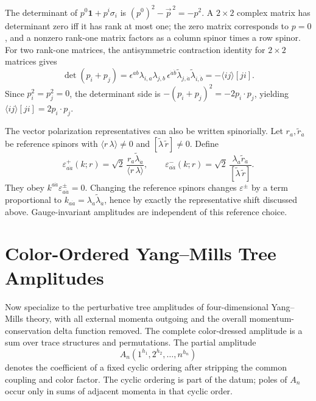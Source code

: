 The determinant of \(p^0\mathbf 1+p^i\sigma_i\) is
\((p^0)^2-\vec p^{\,2}=-p^2\).  A \(2\times2\) complex matrix has determinant
zero iff it has rank at most one; the zero matrix corresponds to \(p=0\), and
a nonzero rank-one matrix factors as a column spinor times a row spinor.  For
two rank-one matrices, the antisymmetric contraction identity for \(2\times2\)
matrices gives
\[
  \det(p_i+p_j)
  =
  \epsilon^{ab}\lambda_{i,a}\lambda_{j,b}\,
  \epsilon^{\dot a\dot b}
  \widetilde\lambda_{j,\dot a}\widetilde\lambda_{i,\dot b}
  =
  -\langle ij\rangle[ji].
\]
Since \(p_i^2=p_j^2=0\), the determinant side is
\(-(p_i+p_j)^2=-2p_i\cdot p_j\), yielding
\(\langle ij\rangle[ji]=2p_i\cdot p_j\).

The vector polarization representatives can also be written spinorially.  Let
\(r_a,\widetilde r_{\dot a}\) be reference spinors with
\(\langle r\,\lambda\rangle\ne0\) and
\([\widetilde\lambda\,\widetilde r]\ne0\).  Define
\begin{equation}
  \varepsilon^+_{a\dot a}(k;r)
  =
  \sqrt2\,\frac{r_a\widetilde\lambda_{\dot a}}
  {\langle r\,\lambda\rangle},
  \qquad
  \varepsilon^-_{a\dot a}(k;r)
  =
  \sqrt2\,\frac{\lambda_a\widetilde r_{\dot a}}
  {[\widetilde\lambda\,\widetilde r]} .
  \label{eq:spinor-helicity-polarization-vectors}
\end{equation}
They obey \(k^{a\dot a}\varepsilon^\pm_{a\dot a}=0\).  Changing the reference
spinors changes \(\varepsilon^\pm\) by a term proportional to
\(k_{a\dot a}=\lambda_a\widetilde\lambda_{\dot a}\), hence by exactly the
representative shift discussed above.  Gauge-invariant amplitudes are
independent of this reference choice.

\section{Color-Ordered Yang--Mills Tree Amplitudes}
\label{sec:color-ordered-tree-amplitudes}

Now specialize to the perturbative tree amplitudes of four-dimensional
Yang--Mills theory, with all external momenta outgoing and the overall
momentum-conservation delta function removed.  The complete color-dressed
amplitude is a sum over trace structures and permutations.  The partial
amplitude
\[
  A_n(1^{h_1},2^{h_2},\ldots,n^{h_n})
\]
denotes the coefficient of a fixed cyclic ordering after stripping the common
coupling and color factor.  The cyclic ordering is part of the datum; poles of
\(A_n\) occur only in sums of adjacent momenta in that cyclic order.

